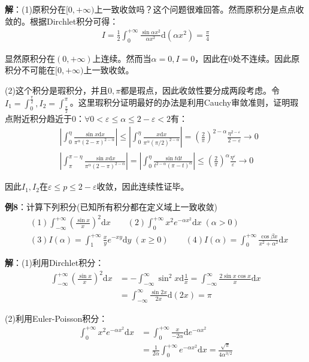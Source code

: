 \documentclass{ctexart}
\let\oldtextbf\textbf
\renewcommand{\textbf}[1]{\textcolor{brown!50!red}{\oldtextbf{#1}}}
\begin{document}
\textbf{\color{brown!50!red}解}：(1)原积分在$[0,+\infty)$上一致收敛吗？这个问题很难回答。然而原积分是点点收敛的。根据Dirchlet积分可得：
\begin{align*}
I=\frac{1}{2}\int_0^{+\infty}\frac{\sin \alpha x^2}{\alpha x^2}\mathrm{d}(\alpha x^2)=\frac{\pi}{4}   
\end{align*}

显然原积分在$(0,+\infty)$上连续。然而当$\alpha=0,I=0$，因此在0处不连续。因此原积分不可能在$[0,+\infty)$上一致收敛。

(2)这个积分是瑕积分，并且$0,\pi$都是瑕点，因此收敛性要分成两段考虑。令$I_1=\int_0^{\frac{\pi}{2}},I_2=\int_{\frac{\pi}{2}}^\pi$。这里瑕积分证明最好的办法是利用Cauchy审敛准则，证明瑕点附近积分趋近于0：$\forall 0<\varepsilon\leq \alpha\leq 2-\varepsilon<2$有：
\begin{align*}
&|\int_0^\eta \frac{\sin x\mathrm{d}x }{\pi^\alpha(2-\pi)^{2-\alpha}}|\leq |\int_0^\eta\frac{x\mathrm{d}x}
{\pi^\alpha (\pi/2)^{2-\alpha}}|=(\frac{2}{\pi} )^{2-\alpha}\frac{\eta^{2-\varepsilon }}{2-\varepsilon}\to 0\\
 &|\int_\pi^{\pi-\eta} \frac{\sin x\mathrm{d}x }{\pi^\alpha(2-\pi)^{2-\alpha}}|
=|\int_0^\eta \frac{\sin t\mathrm{d}t }{t^{2-\alpha}(\pi-t)^{\alpha}}|\leq
(\frac{2}{\pi} )^{\alpha}\frac{\eta^{\varepsilon }}{\varepsilon}\to 0
\end{align*}

因此$I_1,I_2$在$\varepsilon\leq p\leq 2-\varepsilon$收敛，因此连续性证毕。

\textbf{\color{brown!50!red}例8}：计算下列积分(已知所有积分都在定义域上一致收敛)
\begin{align*}
    &(1)\int_{-\infty}^{+\infty}(\frac{\sin x}{x})^2\mathrm{d}x\qquad   (2)\int_0^{+\infty}x^2e^{-\alpha x^2}\mathrm{d}x\;(\alpha>0)\\
    &(3)I(\alpha)=\int_1^{+\infty}\frac{x}{y}e^{-xy}\mathrm{d}y\;(x\geq 0)\qquad (4) I(\alpha)=\int_0^{+\infty}\frac{\cos\beta x}{x^2+\alpha^2}\mathrm{d}x
\end{align*}

\textbf{\color{brown!50!red}解}：(1)利用Dirchlet积分：
\begin{align*}
\int_{-\infty}^{+\infty}(\frac{\sin x}{x})^2\mathrm{d}x&=-\int_{-\infty}^\infty \sin^2x\mathrm{d}
\frac{1}{x}=\int_{-\infty}^\infty \frac{2\sin x\cos x}{x}\mathrm{d}x    \\
&=\int_{-\infty}^\infty\frac{\sin 2x}{2x}\mathrm{d}(2x)=\pi 
\end{align*}

(2)利用Euler-Poisson积分：
\begin{align*}
\int_0^{+\infty}x^2e^{-\alpha x^2}\mathrm{d}x&=\int_0^{+\infty}\frac{x}{-2\alpha}
\mathrm{d}e^{-\alpha x^2}\\
&=\frac{1}{2\alpha}\int_0^{+\infty}e^{-\alpha x^2}\mathrm{d}x =\frac{\sqrt{\pi}}{4\alpha^{3/2}}
\end{align*}
\end{document}
